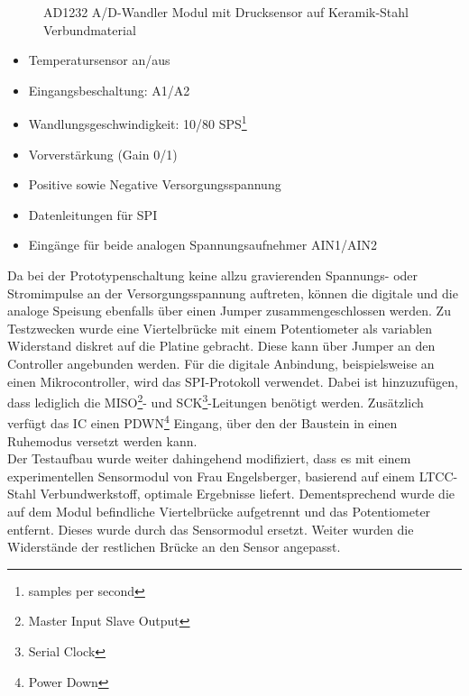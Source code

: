 \documentclass[12pt]{scrreprt} %
\begin{document}
\begin{figure}
\centering
{}
\caption[AD1232 A/D-Wandler Modul mit Drucksensor]{AD1232 A/D-Wandler Modul mit Drucksensor auf Keramik-Stahl Verbundmaterial}
\label{pic.ad1232}
\end{figure}
\begin{itemize}
\item
Temperatursensor an/aus
\item
Eingangsbeschaltung: A1/A2
\item
Wandlungsgeschwindigkeit: 10/80 SPS\footnote{samples per second}
\item
Vorverstärkung (Gain 0/1)
\item
Positive sowie Negative Versorgungsspannung
\item
Datenleitungen für SPI
\item
Eingänge für beide analogen Spannungsaufnehmer AIN1/AIN2
\end{itemize}
Da bei der Prototypenschaltung keine allzu gravierenden Spannungs- oder Stromimpulse an der Versorgungsspannung auftreten, können die digitale und die analoge Speisung ebenfalls über einen Jumper zusammengeschlossen werden. Zu Testzwecken wurde eine Viertelbrücke mit einem Potentiometer als variablen Widerstand diskret auf die Platine gebracht. Diese kann über Jumper an den Controller angebunden werden. Für die digitale Anbindung, beispielsweise an einen Mikrocontroller, wird das SPI-Protokoll verwendet. Dabei ist hinzuzufügen, dass lediglich die MISO\footnote{Master Input Slave Output}- und SCK\footnote{Serial Clock}-Leitungen benötigt werden. Zusätzlich verfügt das IC einen PDWN\footnote{Power Down} Eingang, über den der Baustein in einen Ruhemodus versetzt werden kann.\\
Der Testaufbau wurde weiter dahingehend modifiziert, dass es mit einem experimentellen Sensormodul von Frau Engelsberger, basierend auf einem LTCC-Stahl Verbundwerkstoff, optimale Ergebnisse liefert. Dementsprechend wurde die auf dem Modul befindliche Viertelbrücke aufgetrennt und das Potentiometer entfernt. Dieses wurde durch das Sensormodul ersetzt. Weiter wurden die Widerstände der restlichen Brücke an den Sensor angepasst.
\end{document}
